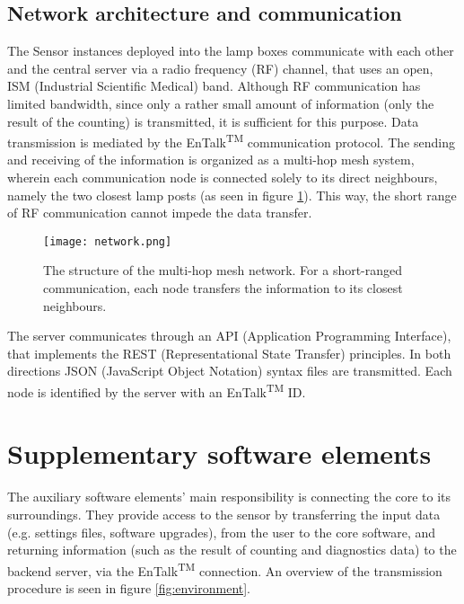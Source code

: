 \subsection{Network architecture and communication}
The Sensor instances deployed into the lamp boxes communicate with each other and the central server via a radio frequency (RF) channel, that uses an open, ISM (Industrial Scientific Medical) band.
Although RF communication has limited bandwidth, since only a rather small amount of information (only the result of the counting) is transmitted, it is sufficient for this purpose.
Data transmission is mediated by the EnTalk\textsuperscript{TM} communication protocol\cite{EnTalk}.
The sending and receiving of the information is organized as a multi-hop mesh system, wherein each communication node is connected solely to its direct neighbours, namely the two closest lamp posts (as seen in figure \ref{fig:network}).
This way, the short range of RF communication cannot impede the data transfer.

\begin{figure}[!h]
	\centering
	\texttt{[image: network.png]}
	\caption[The structure of the multi-hop mesh network]{The structure of the multi-hop mesh network. For a short-ranged communication, each node transfers the information to its closest neighbours. \label{fig:network}}
\end{figure}

The server communicates through an API (Application Programming Interface), that implements the REST (Representational State Transfer) principles. 
In both directions JSON (JavaScript Object Notation) syntax files are transmitted.
Each node is identified by the server with an EnTalk\textsuperscript{TM} ID.
\section{Supplementary software elements}\label{sec:SupplementarySoftware}
The auxiliary software elements' main responsibility is connecting the core to its surroundings.
They provide access to the sensor by transferring the input data (e.g. settings files, software upgrades), from the user to the core software, and returning information (such as the result of counting and diagnostics data) to the backend server, via the EnTalk\textsuperscript{TM} connection.
An overview of the transmission procedure is seen in figure \ref{fig:environment}.

